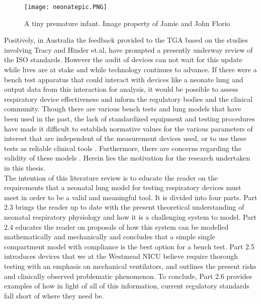 \documentclass[12pt, openany, oneside]{book}
\begin{document}
\begin{figure}[h!]
	\begin{center}	
	\texttt{[image: neonatepic.PNG]}
	\caption[Tiny premature infant]{A tiny premature infant. Image property of Jamie and John Florio} 
	\label{fig:premi}
	\end{center}
\end{figure}



Positively, in Australia the feedback provided to the TGA based on the studies involving Tracy and Hinder et.al, have prompted a presently underway review of the ISO standards. However the audit of devices can not wait for this update while lives are at stake and while technology continues to advance. If there were a bench test apparatus that could interact with devices like a neonate lung and output data from this interaction for analysis, it would be possible to assess respiratory device effectiveness and inform the regulatory bodies and the clinical community. Though there are various bench tests and lung models that have been used in the past, the lack of standardized equipment and testing procedures have made it difficult to establish normative values for the various parameters of interest that are independent of the measurement devices used, or to use these tests as reliable clinical tools \citep{frey2000}. Furthermore, there are concerns regarding the validity of these models \citep{thomas, murray, mark}. Herein lies the motivation for the research undertaken in this thesis.\\


The intention of this literature review is to educate the reader on the requirements that a neonatal lung model for testing respiratory devices must meet in order to be a valid and meaningful tool. It is divided into four parts. Part 2.3 brings the reader up to date with the present theoretical understanding of neonatal respiratory physiology and how it is a challenging system to model. Part 2.4 educates the reader on proposals of how this system can be modelled mathematically and mechanically and concludes that a simple single compartment model with compliance is the best option for a bench test. Part 2.5 introduces devices that we at the Westmead NICU believe require thorough testing with an emphasis on mechanical ventilators, and outlines the present risks and clinically observed problematic phenomenon. To conclude, Part 2.6 provides examples of how in light of all of this information, current regulatory standards fall short of where they need be.\\
\end{document}
